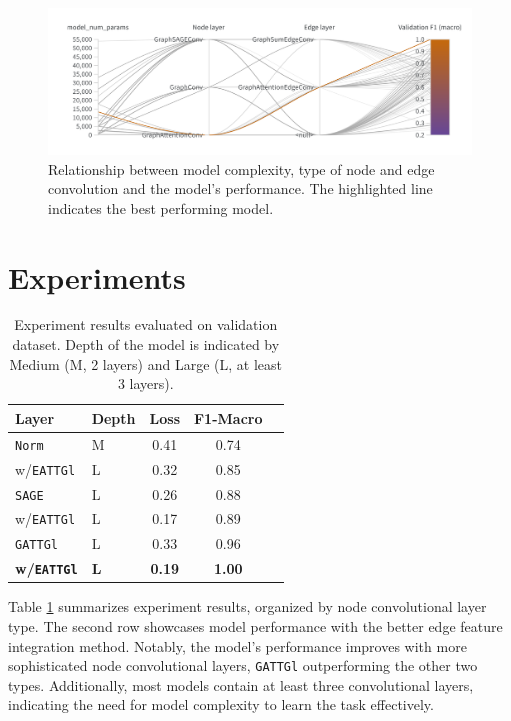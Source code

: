 \documentclass[10pt,twocolumn]{article}
\begin{document}
\begin{figure}
    \centering
    \includegraphics[width=1\textwidth]{figures/hyperparams.png}
    \caption{Relationship between model complexity, type of node and edge convolution and the model's performance. The highlighted line indicates the best performing model.}
    \label{fig:hyperparams}
\end{figure}

\section{Experiments}
\begin{table}[!ht]
    \centering
    \begin{tabular}{llccc}
    \toprule
    \textbf{Layer} & \textbf{Depth} & \textbf{Loss} & \textbf{F1-Macro} \\
    \midrule
    \texttt{Norm} & M & 0.41 & 0.74 \\
    w/\texttt{EATTGl} & L & 0.32 & 0.85 \\
    \midrule
    \texttt{SAGE} & L & 0.26 & 0.88 \\
    w/\texttt{EATTGl} & L & 0.17 & 0.89 \\
    \midrule
    \texttt{GATTGl} & L & 0.33 & 0.96 \\
    \textbf{w/\texttt{EATTGl}} & \textbf{L} & \textbf{0.19} & \textbf{1.00} \\
    \bottomrule
    \end{tabular}
    \caption{Experiment results evaluated on validation dataset. Depth of the model is indicated by Medium (M, 2 layers) and Large (L, at least 3 layers).}
    \label{tab:results}
\end{table}

Table \ref{tab:results} summarizes experiment results, organized by node convolutional layer type. 
The second row showcases model performance with the better edge feature integration method. 
Notably, the model's performance improves with more sophisticated node convolutional layers, \texttt{GATTGl}
outperforming the other two types. Additionally, most models contain at least three convolutional layers, 
indicating the need for model complexity to learn the task effectively.
\end{document}
